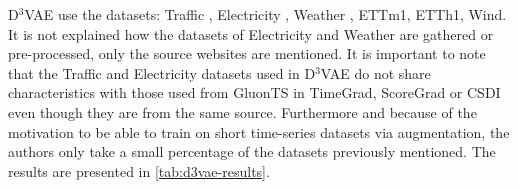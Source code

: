 D$^3$VAE use the datasets: Traffic \cite{cuturi_pems-sf_2011}, Electricity \cite{trindade_electricityloaddiagrams20112014_2015}, Weather \cite{max-planck-institut_fuer_biogeochemie_weather_2008}, ETTm1\cite{zhou_informer_2021}, ETTh1\cite{zhou_informer_2021}, Wind\cite{li_generative_2022}. It is not explained how the datasets of Electricity  \cite{trindade_electricityloaddiagrams20112014_2015} and Weather \cite{max-planck-institut_fuer_biogeochemie_weather_2008} are gathered or pre-processed, only the source websites are mentioned. It is important to note that the Traffic and Electricity datasets used in D$^3$VAE do not share characteristics with those used from GluonTS in TimeGrad, ScoreGrad or CSDI even though they are from the same source. Furthermore and because of the motivation to be able to train on short time-series datasets via augmentation, the authors only take a small percentage of the datasets previously mentioned. The results are presented in \autoref{tab:d3vae-results}.

